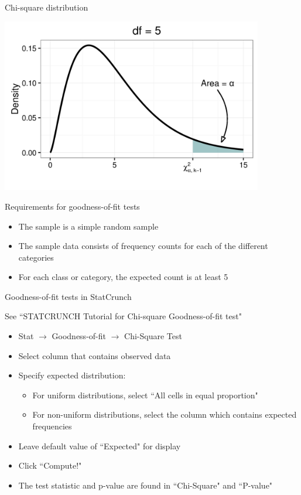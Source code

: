 \documentclass[xcolor=table, handout]{beamer}
\begin{document}
\begin{frame}{Chi-square distribution}
\bigskip
{\centering
\includegraphics[width=4.5in]{../images/ch11_chi_square_crit}
\par}
\end{frame}



\begin{frame}{Requirements for goodness-of-fit tests}
\begin{block}{}
\large
\begin{itemize}
\item The sample is a simple random sample
\pause\item The sample data consists of frequency counts for each of the different categories
\pause\item For each class or category, the expected count is at least 5 
\end{itemize}
\end{block}
\end{frame}


\begin{frame}{Goodness-of-fit tests in StatCrunch}
\begin{alertblock}{}
See ``STATCRUNCH Tutorial for Chi-square Goodness-of-fit test"
\end{alertblock}

\begin{block}{}
\begin{itemize}
\item Stat $\to$ Goodness-of-fit $\to$ Chi-Square Test
\item Select column that contains observed data
\item Specify expected distribution:
\begin{itemize}
\item For uniform distributions, select ``All cells in equal proportion"
\item For non-uniform distributions, select the column which contains expected frequencies
\end{itemize}
\item Leave default value of ``Expected" for display
\item Click ``Compute!"
\item The test statistic and p-value are found in ``Chi-Square" and ``P-value"
\end{itemize}
\end{block}
\end{frame}
\end{document}
